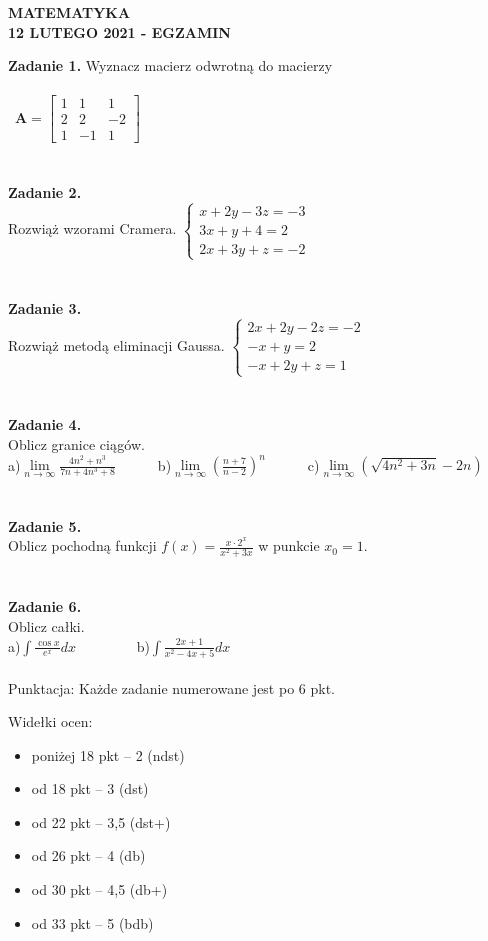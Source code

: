 \documentclass[12pt,a4paper]{report}
\begin{document}
\begin{center}

\textbf{MATEMATYKA \\12 LUTEGO 2021 - EGZAMIN}

\end{center}\textbf{Zadanie 1.} Wyznacz macierz odwrotną do macierzy \\\\\ $\mathbf{A} =\left[ \begin{array}{ccc}1 & 1& 1\\2& 2& -2\\1 & -1& 1\end{array} \right]$\\\\\\\textbf{Zadanie 2.} \\Rozwiąż wzorami Cramera. $\left\{ \begin{array}{ll}x+2y-3z=-3\\ 3x+y+4=2\\2x+3y+z=-2\end{array} \right.$\\\\\\\textbf{Zadanie 3.} \\Rozwiąż metodą eliminacji Gaussa. $\left\{ \begin{array}{ll}2x+2y-2z=-2\\ -x+y=2\\-x+2y+z=1\end{array} \right.$\\\\\\\textbf{Zadanie 4.} \\Oblicz granice ciągów.\\a)$\lim\limits_{n\to\infty}\frac{4n^2+n^3}{7n+4n^3+8}$\ \ \ \ \ \  b)$\lim\limits_{n\to \infty}(\frac{n+7}{n-2})^n$\ \ \ \ \ \ c)$\lim\limits_{n\to\infty}\left( \sqrt{4n^2+3n}-2n\right)$\\\\\\\textbf{Zadanie 5.} \\ Oblicz pochodną funkcji $f(x)=\frac{x\cdot 2^x}{x^2+3x}$ w punkcie $x_0=1$.\\\\\\\textbf{Zadanie 6.} \\Oblicz całki. \\a)$\int \frac{\cos x}{e^x} dx$ \ \ \ \ \ \ \ \ b)$\int \frac{2x+1}{x^2-4x+5} dx$\\\\Punktacja: Każde zadanie numerowane jest po 6 pkt.



Widełki ocen:

\begin{itemize}

\item poniżej 18 pkt -- 2 (ndst)

\item od 18 pkt -- 3 (dst)

\item od 22 pkt -- 3,5 (dst+)

\item od 26 pkt -- 4 (db)

\item od 30 pkt -- 4,5 (db+)

\item od 33 pkt -- 5 (bdb)

\end{itemize}
\end{document}
